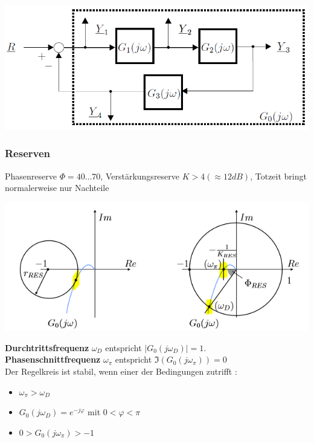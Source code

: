 \begin{center}
	\includegraphics[width=\columnwidth]{Images/kreisschaltung}\\
\end{center}

\subsubsection{Reserven}
 Phasenreserve $\Phi = 40\dots70$, Verstärkungsreserve $K > 4 (\approx 12dB)$, Totzeit bringt normalerweise nur Nachteile
\begin{center}
	\includegraphics[width=\columnwidth]{Images/reserve}
\end{center}
\textbf{Durchtrittsfrequenz} $\omega_D$ entspricht $\left|G_0(j\omega_D)\right| = 1$.\\
\textbf{Phasenschnittfrequenz} $\omega_\pi$ entspricht $\Im(G_0(j\omega_\pi)) = 0$~\\

\noindent Der Regelkreis ist stabil, wenn einer der Bedingungen zutrifft :
\begin{itemize}[nosep]
	\item $\omega_\pi > \omega_D$
	\item $G_0(j\omega_D) = e^{-j\varphi}$ mit $0 < \varphi < \pi$
	\item $0 > G_0(j\omega_\pi) > -1$
\end{itemize}
~\\


